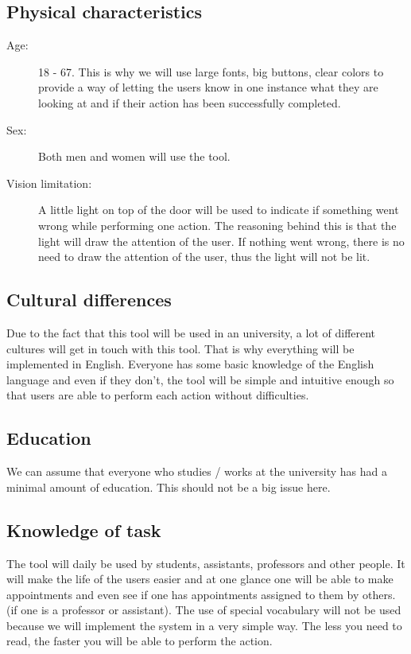 \documentclass[11pt, a4paper,svglistings]{report}
\begin{document}
\subsection{Physical characteristics}

\begin{description}
\item[Age:] 18 - 67. This is why we will use large fonts, big buttons, clear colors to provide a way of letting the users know in one instance what they are looking at and if their action has been successfully completed.
\item[Sex:] Both men and women will use the tool.
\item[Vision limitation:] A little light on top of the door will be used to indicate if something went wrong while performing one action. The reasoning behind this is that the light will draw the attention of the user. If nothing went wrong, there is no need to draw the attention of the user, thus the light will not be lit.
\end{description}

\subsection{Cultural differences}

Due to the fact that this tool will be used in an university, a lot of different cultures will get in touch with this tool. That is why everything will be implemented in English. Everyone has some basic knowledge of the English language and even if they don't, the tool will be simple and intuitive enough so that users are able to perform each action without difficulties. 

\subsection{Education}

We can assume that everyone who studies / works at the university has had a minimal amount of education. This should not be a big issue here.

\subsection{Knowledge of task}

The tool will daily be used by students, assistants, professors and other people. It will make the life of the users easier and at one glance one will be able to make appointments and even see if one has appointments assigned to them by others. (if one is a professor or assistant). The use of special vocabulary will not be used because we will implement the system in a very simple way. The less you need to read, the faster you will be able to perform the action.
\end{document}
